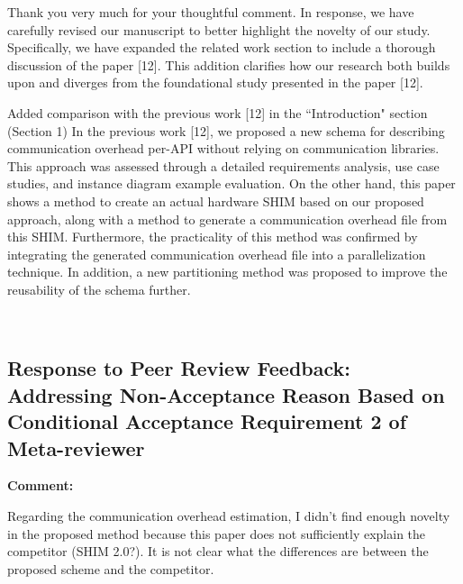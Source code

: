 \documentclass{article}
\begin{document}
\begin{adjustwidth}{1cm}{1cm}  %
Thank you very much for your thoughtful comment. In response, we have carefully revised our manuscript to better highlight the novelty of our study. Specifically, we have expanded the related work section to include a thorough discussion of the paper [12]. 
This addition clarifies how our research both builds upon and diverges from the foundational study presented in the paper [12].
\end{adjustwidth}
\bigskip
\begin{itembox}[|]{Added comparison with the previous work [12] in the ``Introduction" section (Section 1)}
In the previous work [12], we proposed a new schema for describing communication overhead per-API without relying on communication libraries. This approach was assessed through a detailed requirements analysis, use case studies, and instance diagram example evaluation. On the other hand, this paper shows a method to create an actual hardware SHIM based on our proposed approach, along with a method to generate a communication overhead file from this SHIM. Furthermore, the practicality of this method was confirmed by integrating the generated communication overhead file into a parallelization technique. In addition, a new partitioning method was proposed to improve the reusability of the schema further.
\end{itembox}\\


\newpage
\subsection{Response to Peer Review Feedback: Addressing Non-Acceptance Reason Based on Conditional Acceptance Requirement 2 of Meta-reviewer}

\begin{flushleft}
  \textbf{Comment:}

\end{flushleft}
\begin{adjustwidth}{1cm}{1cm}  %
 Regarding the communication overhead estimation, I didn't find enough novelty in the proposed method because this paper does not sufficiently explain the competitor (SHIM 2.0?).
  It is not clear what the differences are between the proposed scheme and the competitor.
\end{adjustwidth}
    
\end{document}

